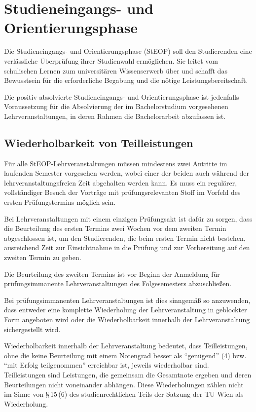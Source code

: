 \section{Studieneingangs- und Orientierungsphase}\label{sec:STEOP}

Die Studieneingangs- und Orientierungsphase (StEOP) soll den
Studierenden eine verlässliche Überprüfung ihrer Studienwahl
ermöglichen. Sie leitet vom schulischen Lernen zum universitären
Wissenserwerb über und schafft das Bewusstsein für die erforderliche
Begabung und die nötige Leistungsbereitschaft.

%

Die positiv absolvierte Studieneingangs- und Orientierungsphase ist
jedenfalls Voraussetzung für die Absolvierung der im Bachelorstudium
vorgesehenen Lehrveranstaltungen, in deren Rahmen die Bachelorarbeit
abzufassen ist.

\subsection*{Wiederholbarkeit von Teilleistungen}

Für alle StEOP-Lehrveranstaltungen müssen mindestens zwei Antritte im
laufenden Semester vorgesehen werden, wobei einer der beiden auch
während der lehrveranstaltungsfreien Zeit abgehalten werden kann. Es
muss ein regulärer, vollständiger Besuch der Vorträge mit
prüfungsrelevanten Stoff im Vorfeld des ersten Prüfungstermins möglich
sein.

Bei Lehrveranstaltungen mit einem einzigen Prüfungsakt ist dafür zu
sorgen, dass die Beurteilung des ersten Termins zwei Wochen vor dem
zweiten Termin abgeschlossen ist, um den Studierenden, die beim ersten
Termin nicht bestehen, ausreichend Zeit zur Einsichtnahme in die
Prüfung und zur Vorbereitung auf den zweiten Termin zu geben.

Die Beurteilung des zweiten Termins ist vor Beginn der Anmeldung für
prüfungsimmanente Lehrveranstaltungen des Folgesemesters
abzuschließen.

Bei prüfungsimmanenten Lehrveranstaltungen ist dies sinngemäß so
anzuwenden, dass entweder eine komplette Wiederholung der
Lehrveranstaltung in geblockter Form angeboten wird oder die
Wiederholbarkeit innerhalb der Lehrveranstaltung sichergestellt
wird.

Wiederholbarkeit innerhalb der Lehrveranstaltung bedeutet, dass
Teilleistungen, ohne die keine Beurteilung mit einem Notengrad besser
als "`genügend"' (4) bzw. "`mit Erfolg teilgenommen"' erreichbar ist,
jeweils wiederholbar sind. Teilleistungen sind Leistungen, die
gemeinsam die Gesamtnote ergeben und deren Beurteilungen nicht
voneinander abhängen. Diese Wiederholungen zählen nicht im Sinne von
§\,15\,(6) des studienrechtlichen Teils der Satzung der TU Wien als
Wiederholung.

